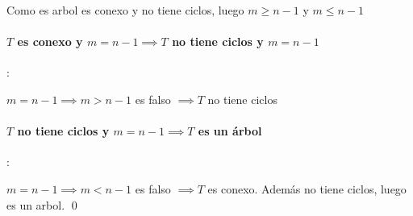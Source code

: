 		Como es arbol es conexo y no tiene ciclos, luego $m \ge n - 1$ y $m \le n - 1$

	\paragraph{
		$T$ es conexo y $m = n - 1 \implies T$ no tiene ciclos y $m = n - 1$
	}:

		$m = n - 1 \implies m > n - 1$ es falso $\implies T$ no tiene ciclos

	\paragraph{
		$T$ no tiene ciclos y $m = n - 1 \implies T$ es un \'arbol
	}:

		$m = n - 1 \implies m < n - 1$ es falso $\implies T$ es conexo.
		Adem\'as no tiene ciclos, luego es un arbol.
	\qed